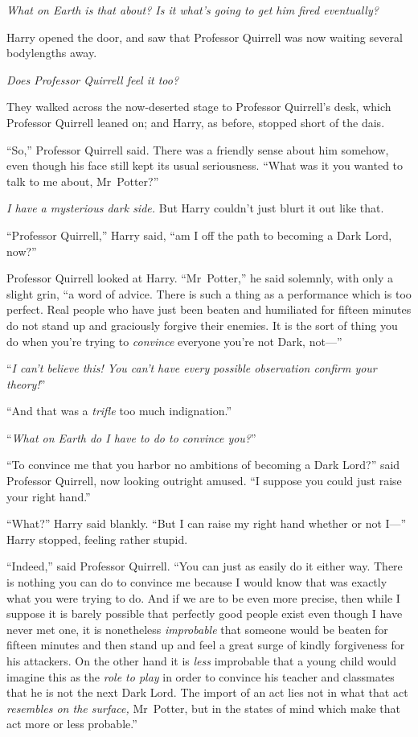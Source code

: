 \emph{What on Earth is that about? Is it what’s going to get him fired eventually?}

Harry opened the door, and saw that Professor Quirrell was now waiting several bodylengths away.

\emph{Does Professor Quirrell feel it too?}

They walked across the now-deserted stage to Professor Quirrell’s desk, which Professor Quirrell leaned on; and Harry, as before, stopped short of the dais.

“So,” Professor Quirrell said. There was a friendly sense about him somehow, even though his face still kept its usual seriousness. “What was it you wanted to talk to me about, Mr~Potter?”

\emph{I have a mysterious dark side.} But Harry couldn’t just blurt it out like that.

“Professor Quirrell,” Harry said, “am I off the path to becoming a Dark Lord, now?”

Professor Quirrell looked at Harry. “Mr~Potter,” he said solemnly, with only a slight grin, “a word of advice. There is such a thing as a performance which is too perfect. Real people who have just been beaten and humiliated for fifteen minutes do not stand up and graciously forgive their enemies. It is the sort of thing you do when you’re trying to \emph{convince} everyone you’re not Dark, not—”

“\emph{I can’t believe this! You can’t have every possible observation confirm your theory!}”

“And that was a \emph{trifle} too much indignation.”

“\emph{What on Earth do I have to do to convince you?}”

“To convince me that you harbor no ambitions of becoming a Dark Lord?” said Professor Quirrell, now looking outright amused. “I suppose you could just raise your right hand.”

“What?” Harry said blankly. “But I can raise my right hand whether or not I—” Harry stopped, feeling rather stupid.

“Indeed,” said Professor Quirrell. “You can just as easily do it either way. There is nothing you can do to convince me because I would know that was exactly what you were trying to do. And if we are to be even more precise, then while I suppose it is barely possible that perfectly good people exist even though I have never met one, it is nonetheless \emph{improbable} that someone would be beaten for fifteen minutes and then stand up and feel a great surge of kindly forgiveness for his attackers. On the other hand it is \emph{less} improbable that a young child would imagine this as the \emph{role to play} in order to convince his teacher and classmates that he is not the next Dark Lord. The import of an act lies not in what that act \emph{resembles on the surface,} Mr~Potter, but in the states of mind which make that act more or less probable.”

